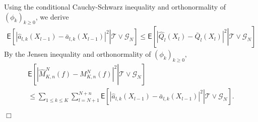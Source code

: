 \documentclass[aap,preprint]{imsart}
\def\TrainSet{\mathcal{T}}
\newcommand{\proofendsign}{$\Box$}
\newenvironment{proof}{{\noindent \bf Proof }}
 {{\hspace*{\fill}\proofendsign\par\bigskip}}
\begin{document}
\begin{proof}
Using the conditional Cauchy-Schwarz inequality and  orthonormality of \((\phi_k)_{k\geq 0}\), we derive
\begin{eqnarray*}
\mathsf{E}\left[\left.\left|\widehat{a}_{l,k}(X_{l-1})-\bar a_{l,k}(X_{l-1})\right|^{2}\right | \TrainSet \vee \mathcal{G}_N\right]\leq\mathsf{E}\left[\left.\left|\widehat{Q}_{l}\left(X_{l}\right)-\bar Q_{l}\left(X_{l}\right)\right|^{2}\right | \TrainSet \vee \mathcal{G}_N\right]
\end{eqnarray*}
By the Jensen inequality and orthonormality of \((\phi_k)_{k\geq 0},\)
\begin{multline*}
\mathsf{E}\left[\left.\left|\widehat{M}_{K,n}^{N}(f)-M_{K,n}^{N}(f)\right|^{2}\right | \TrainSet \vee \mathcal{G}_N\right]
\\
\leq \sum_{1\leq k\le K}\sum_{l=N+1}^{N+n}\mathsf{E}\left[\left.\left|\widehat{a}_{l,k}(X_{l-1})-\bar a_{l,k}(X_{l-1})\right|^{2}\right | \TrainSet \vee \mathcal{G}_N\right].
\end{multline*}
\end{proof}
\end{document}
